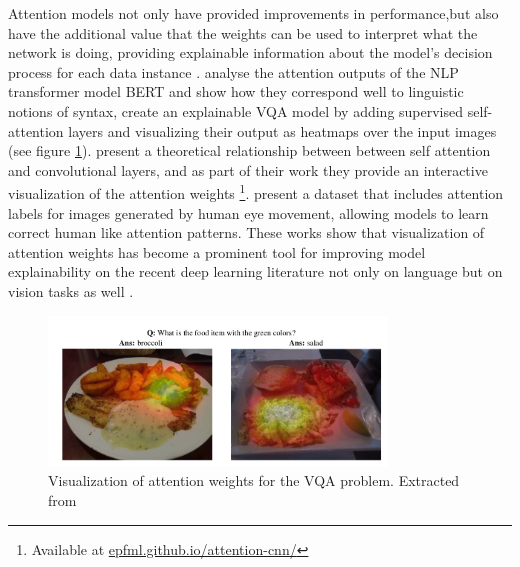 Attention models not only have provided improvements in performance,but also have the additional
value that the weights can be used to interpret what the network is doing, providing
explainable information about the model's decision process for each data instance \cite{wiegreffe_attention}.
 analyse the attention outputs of the NLP transformer model BERT and show how they correspond
well to linguistic notions of syntax,  create an explainable VQA model by adding
supervised self-attention layers and visualizing their output as heatmaps over the input images
(see figure \ref{fig:vqa}).  present a theoretical  relationship between
between self attention and convolutional layers, and as part of their work they provide an interactive visualization
of the attention weights \footnote{Available at \url{epfml.github.io/attention-cnn/}}.  present
a dataset that includes attention labels for images generated by human eye movement, allowing models to learn
correct human like attention patterns. 	These works show that visualization of attention weights has become a prominent tool
for improving model explainability on the recent deep learning literature not only on language but on
vision tasks as well \cite{zhang_relation, johnston_depth, carion_object}.



\begin{figure}[ht]
	\begin{center}
	\includegraphics[width=0.8\textwidth]{./figures/soto.png}
	\caption[Attention on VQA]{Visualization of attention weights for the VQA problem. Extracted from  }
	\label{fig:vqa}
	\end{center}
\end{figure}

